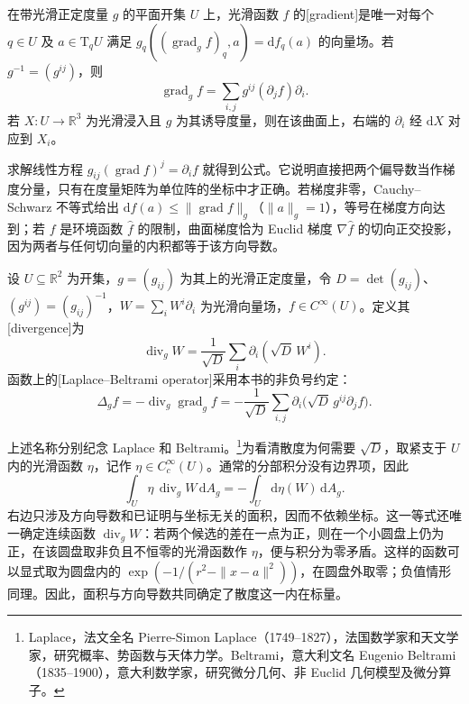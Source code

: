 \begin{definition}\label{g1:def:surface-gradient}
	在带光滑正定度量 \(g\) 的平面开集 \(U\) 上，光滑函数 \(f\) 的[gradient]是唯一对每个 \(q\in U\) 及 \(a\in\mathrm{T}_qU\) 满足 \(g_q((\operatorname{grad}_g f)_q,a)=\mathrm{d}f_q(a)\) 的向量场。若 \(g^{-1}=(g^{ij})\)，则
	\begin{equation}\label{g1:eq:surface-gradient}
		\operatorname{grad}_g f=\sum_{i,j}g^{ij}(\partial_j f)\partial_i.
	\end{equation}
	若 \(X:U\to\mathbb R^3\) 为光滑浸入且 \(g\) 为其诱导度量，则在该曲面上，右端的 \(\partial_i\) 经 \(\mathrm{d}X\) 对应到 \(X_i\)。
\end{definition}

求解线性方程 \(g_{ij}(\operatorname{grad}f)^j=\partial_i f\) 就得到公式。它说明直接把两个偏导数当作梯度分量，只有在度量矩阵为单位阵的坐标中才正确。若梯度非零，Cauchy--Schwarz 不等式给出 \(\mathrm{d}f(a)\le\|\operatorname{grad}f\|_g\)（\(\|a\|_g=1\)），等号在梯度方向达到；若 \(f\) 是环境函数 \(\widehat f\) 的限制，曲面梯度恰为 Euclid 梯度 \(\nabla\widehat f\) 的切向正交投影，因为两者与任何切向量的内积都等于该方向导数。

\begin{definition}\label{g1:def:surface-divergence-laplacian}
	设 \(U\subseteq\mathbb R^2\) 为开集，\(g=(g_{ij})\) 为其上的光滑正定度量，令 \(D=\det(g_{ij})\)、\((g^{ij})=(g_{ij})^{-1}\)，\(W=\sum_iW^i\partial_i\) 为光滑向量场，\(f\in C^\infty(U)\)。定义其[divergence]为
	\begin{equation}\label{g1:eq:surface-divergence}
		\operatorname{div}_gW=\frac1{\sqrt D}\sum_i\partial_i(\sqrt D\,W^i).
	\end{equation}
	函数上的[Laplace--Beltrami operator]采用本书的非负号约定：
	\begin{equation}\label{g1:eq:surface-laplacian}
		\Delta_g f=-\operatorname{div}_g\operatorname{grad}_g f
		=-\frac1{\sqrt D}\sum_{i,j}\partial_i\bigl(\sqrt D\,g^{ij}\partial_jf\bigr).
	\end{equation}
\end{definition}

上述名称分别纪念 Laplace 和 Beltrami。\footnote{Laplace，法文全名 Pierre-Simon Laplace（1749--1827），法国数学家和天文学家，研究概率、势函数与天体力学。Beltrami，意大利文名 Eugenio Beltrami（1835--1900），意大利数学家，研究微分几何、非 Euclid 几何模型及微分算子。}为看清散度为何需要 \(\sqrt D\)，取紧支于 \(U\) 内的光滑函数 \(\eta\)，记作 \(\eta\in C_c^\infty(U)\)。通常的分部积分没有边界项，因此
\begin{equation}\label{g1:eq:surface-divergence-weak}
	\int_U\eta\,\operatorname{div}_gW\,\mathrm{d}A_g
	=-\int_U \mathrm{d}\eta(W)\,\mathrm{d}A_g.
\end{equation}
右边只涉及方向导数和已证明与坐标无关的面积，因而不依赖坐标。这一等式还唯一确定连续函数 \(\operatorname{div}_gW\)：若两个候选的差在一点为正，则在一个小圆盘上仍为正，在该圆盘取非负且不恒零的光滑函数作 \(\eta\)，便与积分为零矛盾。这样的函数可以显式取为圆盘内的 \(\exp(-1/(r^2-\|x-a\|^2))\)，在圆盘外取零；负值情形同理。因此，面积与方向导数共同确定了散度这一内在标量。

